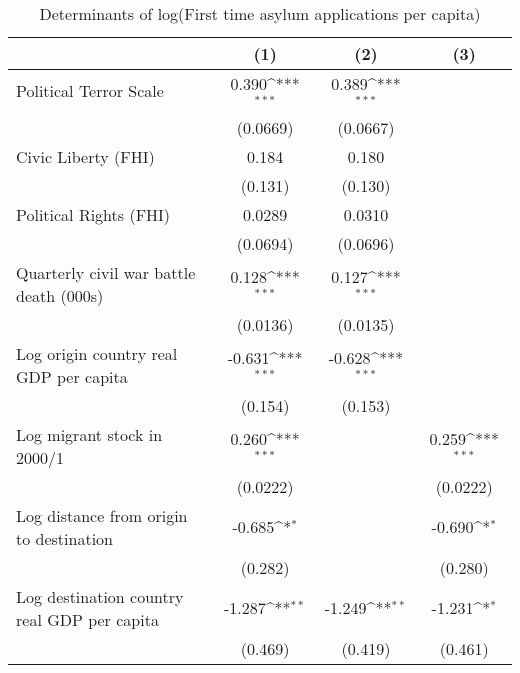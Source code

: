 \begin{table}[htbp]\centering
\def\sym#1{\ifmmode^{#1}\else\(^{#1}\)\fi}
\caption{Determinants of log(First time asylum applications per capita)}
\begin{tabular}{l*{3}{c}}
\hline\hline
                    &\multicolumn{1}{c}{(1)}         &\multicolumn{1}{c}{(2)}         &\multicolumn{1}{c}{(3)}         \\
\hline
Political Terror Scale&       0.390\sym{***}&       0.389\sym{***}&                     \\
                    &    (0.0669)         &    (0.0667)         &                     \\
[1em]
Civic Liberty (FHI) &       0.184         &       0.180         &                     \\
                    &     (0.131)         &     (0.130)         &                     \\
[1em]
Political Rights (FHI)&      0.0289         &      0.0310         &                     \\
                    &    (0.0694)         &    (0.0696)         &                     \\
[1em]
Quarterly civil war battle death (000s)&       0.128\sym{***}&       0.127\sym{***}&                     \\
                    &    (0.0136)         &    (0.0135)         &                     \\
[1em]
Log origin country real GDP per capita&      -0.631\sym{***}&      -0.628\sym{***}&                     \\
                    &     (0.154)         &     (0.153)         &                     \\
[1em]
Log migrant stock in 2000/1&       0.260\sym{***}&                     &       0.259\sym{***}\\
                    &    (0.0222)         &                     &    (0.0222)         \\
[1em]
Log distance from origin to destination&      -0.685\sym{*}  &                     &      -0.690\sym{*}  \\
                    &     (0.282)         &                     &     (0.280)         \\
[1em]
Log destination country real GDP per capita&      -1.287\sym{**} &      -1.249\sym{**} &      -1.231\sym{*}  \\
                    &     (0.469)         &     (0.419)         &     (0.461)         \\

\end{tabular}
\end{table}
